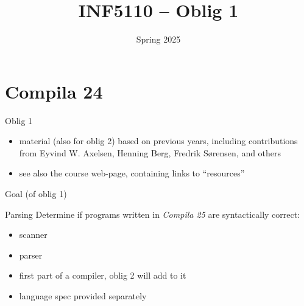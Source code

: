 \documentclass{beamer}
\date{Spring 2025}
\title{INF5110 -- Oblig 1}
\renewcommand{\maketitle}{}
\begin{document}
\maketitle
\chapter{Compila 24}
\label{sec:org72a148c}

\begin{frame}[label={sec:orgac83d96}]{Oblig 1}
\begin{itemize}
\item material (also for oblig 2) based on previous years, including contributions from Eyvind
W. Axelsen, Henning Berg, Fredrik Sørensen, and others
\end{itemize}


\begin{itemize}
\item see also the course web-page, containing links to ``resources''
\end{itemize}
\end{frame}
\begin{frame}[label={sec:org4fe809f}]{Goal (of oblig 1)}
\begin{block}{Parsing}
Determine if programs written in \emph{Compila 25} are syntactically correct: 

\begin{itemize}
\item scanner
\item parser
\end{itemize}
\end{block}
\begin{itemize}
\item first part of a compiler, oblig 2 will add to it
\item language spec provided separately
\end{itemize}
\end{frame}
\end{document}
